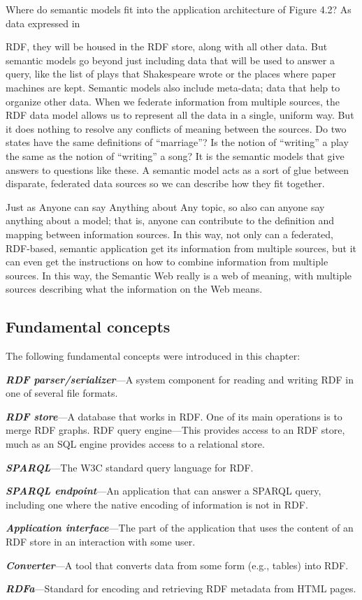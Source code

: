 Where do semantic models fit into the application architecture of Figure
4.2? As data expressed in

RDF, they will be housed in the RDF store, along with all other data.
But semantic models go beyond just including data that will be used to
answer a query, like the list of plays that Shakespeare wrote or the
places where paper machines are kept. Semantic models also include
meta-data; data that help to organize other data. When we federate
information from multiple sources, the RDF data model allows us to
represent all the data in a single, uniform way. But it does nothing to
resolve any conflicts of meaning between the sources. Do two states have
the same definitions of ``marriage''? Is the notion of ``writing'' a
play the same as the notion of ``writing'' a song? It is the semantic
models that give answers to questions like these. A semantic model acts
as a sort of glue between disparate, federated data sources so we can
describe how they fit together.

Just as Anyone can say Anything about Any topic, so also can anyone say
anything about a model; that is, anyone can contribute to the definition
and mapping between information sources. In this way, not only can a
federated, RDF-based, semantic application get its information from
multiple sources, but it can even get the instructions on how to combine
information from multiple sources. In this way, the Semantic Web really
is a web of meaning, with multiple sources describing what the
information on the Web means.

\subsection{Fundamental concepts}

The following fundamental concepts were introduced in this chapter:

\emph{\textbf{RDF parser/serializer}}---A system component for reading and writing RDF
in one of several file formats.

\emph{\textbf{RDF store}}---A database that works in RDF. One of its main operations is
to merge RDF graphs. RDF query engine---This provides access to an RDF
store, much as an SQL engine provides access to a relational store.

\emph{\textbf{SPARQL}}---The W3C standard query language for RDF.

\emph{\textbf{SPARQL endpoint}}---An application that can answer a SPARQL query,
including one where the native encoding of information is not in RDF.

\emph{\textbf{Application interface}}---The part of the application that uses the
content of an RDF store in an interaction with some user.

\emph{\textbf{Converter}}---A tool that converts data from some form (e.g., tables) into
RDF.

\emph{\textbf{RDFa}}---Standard for encoding and retrieving RDF metadata from HTML
pages.
